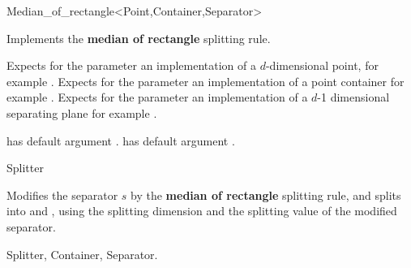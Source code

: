 
\begin{ccRefFunctionObjectClass}{Median_of_rectangle<Point,Container,Separator>}  %

\ccDefinition
Implements the {\bf median of rectangle} splitting rule.

\ccParameters

Expects for the parameter  an implementation of a $d$-dimensional point,
for example . Expects for the parameter  an implementation
of a point container for example .
Expects for the parameter  an implementation of a $d$-1 dimensional 
separating plane for example .

 has default argument .
 has default argument . 



\ccIsModel

Splitter

\ccTypes




\ccOperations

{Modifies the separator $s$ by the {\bf median of rectangle} splitting rule, 
and splits  into  and ,
using the splitting dimension and the splitting value of the modified separator.
}

\ccSeeAlso

Splitter, Container, Separator.
\end{ccRefFunctionObjectClass}




